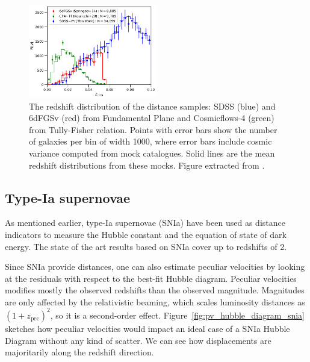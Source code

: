     \begin{figure} 
        \centering 
        \includegraphics[width=0.5\textwidth]{fig/velocities/pv_zdistrib.png}
        \caption{The redshift distribution of the distance samples: 
        SDSS (blue) and 6dFGSv (red) from Fundamental Plane and 
        Cosmicflows-4 (green) from Tully-Fisher relation. 
        Points with error bars show the number of galaxies per bin of width 1000\kms, 
        where error bars include cosmic variance computed from mock catalogues.
        Solid lines are the mean redshift distributions from these mocks.
        Figure extracted from \cite{howlettSloanDigitalSky2022a}. }
        \label{fig:pv_zdistrib}
    \end{figure}




    \subsection{Type-Ia supernovae}
    \label{velocities:measuring:snia}

    As mentioned earlier, type-Ia supernovae (SNIa) have been used as distance indicators 
    to measure the Hubble constant and the equation of state of dark energy. 
    The state of the art results based on SNIa cover up to redshifts of 2. 

    Since SNIa provide distances, one can also estimate peculiar velocities by 
    looking at the residuals with respect to the best-fit Hubble diagram. 
    Peculiar velocities modifies mostly the observed redshifts than the 
    observed magnitude. Magnitudes are only affected by the relativistic 
    beaming, which scales luminosity distances as $(1+z_\text{pec})^2$, 
    so it is a second-order effect. 
    Figure~\ref{fig:pv_hubble_diagram_snia} sketches how peculiar velocities 
    would impact an ideal case of a SNIa Hubble Diagram without any kind of 
    scatter. We can see how displacements are majoritarily along the redshift direction. 


